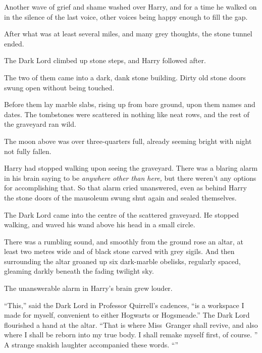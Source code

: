 Another wave of grief and shame washed over Harry, and for a time he walked on in the silence of the last voice, other voices being happy enough to fill the gap.

After what was at least several miles, and many grey thoughts, the stone tunnel ended.

The Dark Lord climbed up stone steps, and Harry followed after.

The two of them came into a dark, dank stone building. Dirty old stone doors swung open without being touched.

Before them lay marble slabs, rising up from bare ground, upon them names and dates. The tombstones were scattered in nothing like neat rows, and the rest of the graveyard ran wild.

The moon above was over three-quarters full, already seeming bright with night not fully fallen.

Harry had stopped walking upon seeing the graveyard. There was a blaring alarm in his brain saying to be \emph{anywhere other than here,} but there weren’t any options for accomplishing that. So that alarm cried unanswered, even as behind Harry the stone doors of the mausoleum swung shut again and sealed themselves.

The Dark Lord came into the centre of the scattered graveyard. He stopped walking, and waved his wand above his head in a small circle.

There was a rumbling sound, and smoothly from the ground rose an altar, at least two metres wide and of black stone carved with grey sigils. And then surrounding the altar groaned up six dark-marble obelisks, regularly spaced, gleaming darkly beneath the fading twilight sky.

The unanswerable alarm in Harry’s brain grew louder.

“This,” said the Dark Lord in Professor Quirrell’s cadences, “is a workspace I made for myself, convenient to either Hogwarts or Hogsmeade.” The Dark Lord flourished a hand at the altar. “That is where Miss~Granger shall revive, and also where I shall be reborn into my true body. I shall remake myself first, of course. ” A strange snakish laughter accompanied these words. “”

